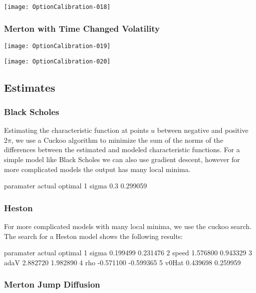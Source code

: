 \documentclass{article}
\begin{document}
\texttt{[image: OptionCalibration-018]}

\subsubsection{Merton with Time Changed Volatility}
\texttt{[image: OptionCalibration-019]}

\texttt{[image: OptionCalibration-020]}

\subsection{Estimates}

\subsubsection{Black Scholes}
Estimating the characteristic function at points \(u\) between negative and positive \(2\pi\), we use a Cuckoo algorithm to minimize the sum of the norms of the differences between the estimated and modeled characteristic functions.  For a simple model like Black Scholes we can also use gradient descent, however for more complicated models the output has many local minima.  

\begin{Schunk}
\begin{Soutput}
  paramater actual  optimal
1     sigma    0.3 0.299059
\end{Soutput}
\end{Schunk}

\subsubsection{Heston}

For more complicated models with many local minima, we use the cuckoo search. The search for a Heston model shows the following results:

\begin{Schunk}
\begin{Soutput}
  paramater    actual   optimal
1     sigma  0.199499  0.231476
2     speed  1.576800  0.943329
3      adaV  2.882720  1.982890
4       rho -0.571100 -0.599365
5     v0Hat  0.439698  0.259959
\end{Soutput}
\end{Schunk}


\subsubsection{Merton Jump Diffusion}
\end{document}

